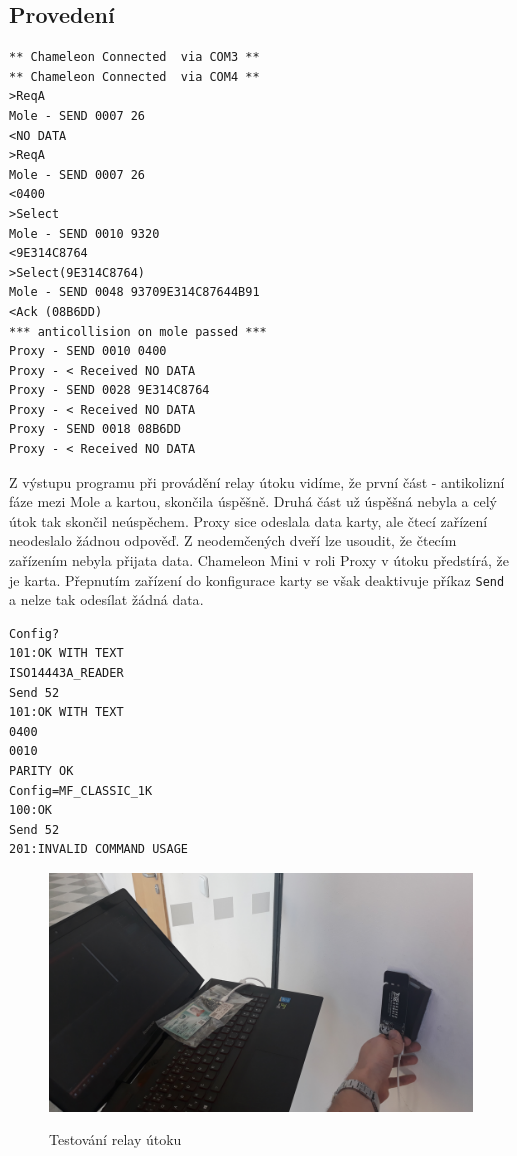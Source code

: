 \subsection{Provedení}



\begin{lstlisting}[caption=Výstup programu MifareProxy.exe při demonstraci, label={relayZaznam}]
** Chameleon Connected  via COM3 **
** Chameleon Connected  via COM4 **
>ReqA
Mole - SEND 0007 26
<NO DATA
>ReqA
Mole - SEND 0007 26
<0400
>Select
Mole - SEND 0010 9320
<9E314C8764
>Select(9E314C8764)
Mole - SEND 0048 93709E314C87644B91
<Ack (08B6DD)
*** anticollision on mole passed ***
Proxy - SEND 0010 0400
Proxy - < Received NO DATA
Proxy - SEND 0028 9E314C8764
Proxy - < Received NO DATA
Proxy - SEND 0018 08B6DD
Proxy - < Received NO DATA
\end{lstlisting}
Z výstupu programu při provádění relay útoku vidíme, že první část - antikolizní fáze mezi Mole a kartou, skončila úspěšně. Druhá část už úspěšná nebyla a celý útok tak skončil neúspěchem. Proxy sice odeslala data karty, ale čtecí zařízení neodeslalo žádnou odpověď. Z neodemčených dveří lze usoudit, že čtecím zařízením nebyla přijata data. Chameleon Mini v roli Proxy v útoku předstírá, že je karta. Přepnutím zařízení do konfigurace karty se však deaktivuje příkaz \verb|Send| a nelze tak odesílat žádná data\cite{ChameleonDocs}. \par
\begin{lstlisting}[caption=Příkaz Send po přepnutí do konfigurace karty nefunguje, label={NefungujiciSend}]
Config?
101:OK WITH TEXT
ISO14443A_READER
Send 52
101:OK WITH TEXT
0400
0010
PARITY OK
Config=MF_CLASSIC_1K
100:OK
Send 52
201:INVALID COMMAND USAGE
\end{lstlisting}

\begin{figure}[ht]\centering
  \centering
  \includegraphics[width=\linewidth]{obrazky-figures/obrazekPokusRelay.jpg}\\[1pt]  
  \caption{Testování relay útoku}    
  \label{obrazekPokusRelay}
\end{figure}

